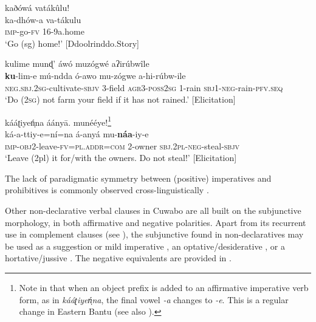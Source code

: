 \documentclass[output=paper,colorlinks=true, citecolor=brown,draftmode]{langscibook}
\begin{document}
\ea\label{ex:cuw:8} kaðówá vatákûlu!  \\
    \gll ka-dhów-a va-tákulu\\
          \textsc{imp}{}-go\textsc{{}-fv} 16-9a.home \\ 
    \glt ‘Go (sg) home!’ [Ddoolrinddo.Story]
\z

{\ea\label{ex:cuw:9} kulime munɖ’ áwó muzógwé aʔirúbwîle  \\
    \gll \textbf{ku}{}-lim-e mú-ndda ó-awo mu-zógwe a-hi-rúbw-ile\\
          \textsc{neg.sbj.2sg-}cultivate-\textsc{sbjv} 3-field \textsc{agr}3-\textsc{poss2sg} 1{}-rain \textsc{sbj1-neg-}rain-\textsc{pfv.seq}  \\
    \glt ‘Do (2\textsc{sg}) not farm your field if it has not rained.’ [Elicitation]
\z }

\ea\label{ex:cuw:10} kááʈiyeń̩na áányā. munééye!\footnote{Note in  that when an object prefix is added to an affirmative imperative verb form, as in \textit{kááʈiyeń̩na}, the final vowel \textit{{}-a} changes to \textit{{}-e}. This is a regular change in Eastern Bantu (see also \citealt{chapters/ruuli}).}\\
    \gll ká-a-ttiy-e=ní=na á-anyá mu-\textbf{náa}{}-iy-e \\
          \textsc{imp-obj2}{}-leave\textsc{{}-fv}=\textsc{pl.addr=com} 2-owner \textsc{sbj.2pl-neg}{}-steal\textsc{{}-sbjv}\\
    \glt ‘Leave (2pl) it for/with the owners. Do not steal!’ [Elicitation]
\z 

The lack of paradigmatic symmetry between (positive) imperatives and prohibitives is commonly observed cross-linguistically \citep{Auwera2006}. 

Other non-declarative verbal clauses in Cuwabo are all built on the subjunctive morphology, in both affirmative and negative polarities. Apart from its recurrent use in complement clauses (see ), the subjunctive found in non-declaratives may be used as a suggestion or mild imperative , an optative/desiderative , or a hortative/jussive . 
The negative equivalents are provided in .
\end{document}
